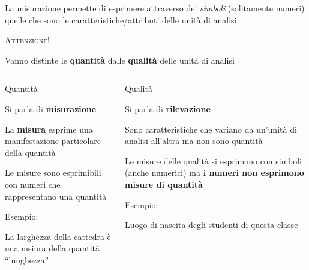 \documentclass[compress]{beamer}
\begin{document}
\begin{frame}
	La misurazione permette di esprimere attraverso dei \emph{simboli} (solitamente numeri) quelle che sono le caratteristiche/attributi delle unità di analisi
	
	\begin{center}
		\scshape{Attenzione!}
	\end{center}
	
	Vanno distinte le \textbf{quantità} dalle \textbf{qualità} delle unità di analisi 
	
	\begin{columns}[T]
		\begin{column}{.50\linewidth}
			\begin{center}
				Quantità
			\end{center}
			\small 
			
			Si parla di \textbf{misurazione}
			
			La \textbf{misura} esprime una manifestazione particolare della quantità
			
			Le misure sono esprimibili con numeri che rappresentano una quantità
			
			\begin{exampleblock}{Esempio:}
				
				La larghezza della cattedra è una msiura della quantità ``lunghezza''
			\end{exampleblock}
		\end{column}
		\pause
		\begin{column}{.50\linewidth}
			\begin{center}
				Qualità
			\end{center}
			\small
			
			Si parla di \textbf{rilevazione}
			
			Sono caratteristiche che variano da un'unità di analisi all'altra ma non sono quantità 
			
			Le misure delle qualità si esprimono con simboli (anche numerici) ma \textbf{i numeri non esprimono misure di quantità}
			
			\begin{exampleblock}{Esempio:}
				
				Luogo di nascita degli studenti di questa classe
			\end{exampleblock}
		\end{column}
	\end{columns}
\end{frame}
\end{document}
